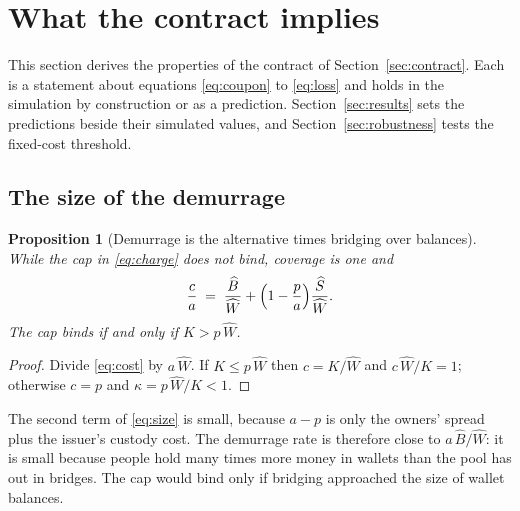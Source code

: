 \documentclass[10pt,a4paper]{article}
\newtheorem{proposition}{Proposition}
\theoremstyle{remark}
\let\savedsection\section
\renewcommand{\section}{\FloatBarrier\savedsection}
\newcommand{\cyc}[1]{\widehat{#1}}
\begin{document}
\section{What the contract implies}
\label{sec:implications}
This section derives the properties of the contract of
Section~\ref{sec:contract}. Each is a statement about equations
\eqref{eq:coupon} to \eqref{eq:loss} and holds in the simulation by
construction or as a prediction. Section~\ref{sec:results} sets the
predictions beside their simulated values, and Section~\ref{sec:robustness}
tests the fixed-cost threshold.

\subsection{The size of the demurrage}
\begin{proposition}[Demurrage is the alternative times bridging over balances]
\label{prop:size}
While the cap in \eqref{eq:charge} does not bind, coverage is one and
\begin{equation}
\frac{c}{a} \;=\; \frac{\cyc B}{\cyc W}+\Bigl(1-\frac{p}{a}\Bigr)\frac{\cyc S}{\cyc W}.
\label{eq:size}
\end{equation}
The cap binds if and only if \(K>p\,\cyc W\).
\end{proposition}
\begin{proof}
Divide \eqref{eq:cost} by \(a\,\cyc W\). If \(K\le p\,\cyc W\) then
\(c=K/\cyc W\) and \(c\,\cyc W/K=1\); otherwise \(c=p\) and
\(\kappa=p\,\cyc W/K<1\).
\end{proof}
The second term of \eqref{eq:size} is small, because \(a-p\) is only the
owners' spread plus the issuer's custody cost. The demurrage rate is therefore close
to \(a\,\cyc B/\cyc W\): it is small because people hold many times more
money in wallets than the pool has out in bridges. The cap would bind only if
bridging approached the size of wallet balances.
\end{document}

